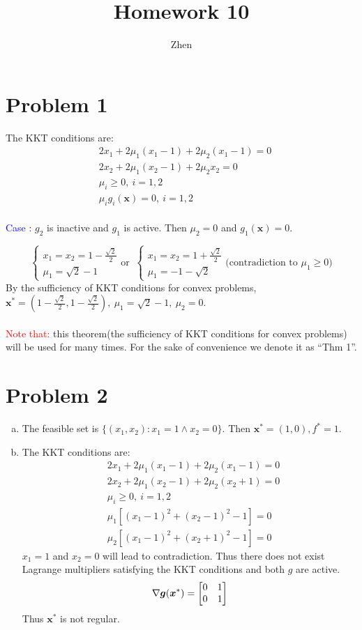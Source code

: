 \documentclass{article}
\def\bg{\boldsymbol{g}}
\def\bx{\boldsymbol{x}}
\def\case#1{\textcolor{blue}{Case \uppercase\expandafter{\romannumeral#1}: }}
\begin{document}
\title{Homework 10}
\author{Zhen}
\maketitle

\section*{Problem 1}

The KKT conditions are:
\[
	\begin{aligned}
		&2x_1+2\mu_1(x_1-1)+2\mu_2(x_1-1)=0
		\\&
		2x_2+2\mu_1(x_2-1)+2\mu_2 x_2=0
		\\&
		\mu_i\ge0,\ i=1,2
		\\&
		\mu_ig_i(\bx)=0,\ i=1,2
	\end{aligned}
\]
\\
\case{1}
$g_2$ is inactive and $g_1$ is active. Then $\mu_2=0$ and $g_1(\bx)=0$.

\[
    \begin{cases}
		x_1=x_2=1-\frac{\sqrt{2}}{2}
		\\
		\mu_1=\sqrt{2}-1
    \end{cases}
	\mbox{or }\ 
	\begin{cases}
		x_1=x_2=1+\frac{\sqrt{2}}{2}
		\\
		\mu_1=-1-\sqrt{2}
    \end{cases}
	\mbox{(contradiction to $\mu_1\ge0$)}
\]
By the sufficiency of KKT conditions for convex problems, $\bx^*=(1-\frac{\sqrt{2}}{2},1-\frac{\sqrt{2}}{2}),\ \mu_1=\sqrt{2}-1,\ \mu_2=0$.
\\
\\
\textcolor{red}{Note that:} this theorem(the sufficiency of KKT conditions for convex problems) will be used for many times. For the sake of convenience we denote it as ``Thm 1''.

\section*{Problem 2}
\begin{enumerate}[(a)]
	\item The feasible set is $\{(x_1,x_2):x_1=1\land x_2=0\}$. Then $\bx^*=(1,0),f^*=1$.
	\item
		The KKT conditions are:
		\[
		    \begin{aligned}
				&2x_1+2\mu_1(x_1-1)+2\mu_2(x_1-1)=0
				\\&
				2x_2+2\mu_1(x_2-1)+2\mu_2(x_2+1)=0
				\\&
				\mu_i\ge0,\ i=1,2
				\\&
				\mu_1[(x_1-1)^2+(x_2-1)^2-1]=0
				\\&
				\mu_2[(x_1-1)^2+(x_2+1)^2-1]=0
	\end{aligned}
		\]
		$x_1=1$ and $x_2=0$ will lead to contradiction. Thus there does not exist Lagrange multipliers  satisfying the KKT conditions and both $g$ are active. 
		\[
			\nabla\bg(\bx^*)=\mqty[0 & 1 \\ 0 & 1]
		\]
		Thus $\bx^*$ is not regular.
\end{enumerate}
\end{document}
